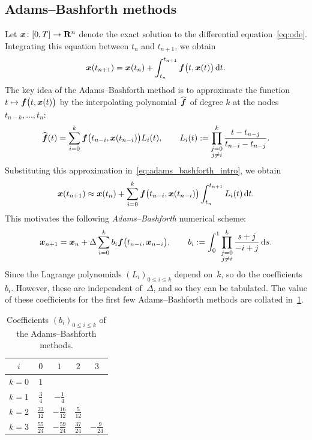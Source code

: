 \subsection{Adams--Bashforth methods}
Let $\mathbf{\boldsymbol{x}}\colon [0, T] \to \mathbf R^n$ denote the exact solution to the differential equation~\eqref{eq:ode}.
Integrating this equation between $t_n$ and $t_{n+1}$,
we obtain
\begin{equation}
    \label{eq:adams_bashforth_intro}
    \mathbf{\boldsymbol{x}}(t_{n+1}) = \mathbf{\boldsymbol{x}}(t_n) + \int_{t_n}^{t_{n+1}} \mathbf{\boldsymbol{f}}\bigl(t, \mathbf{\boldsymbol{x}}(t)\bigr) \, \mathrm d t.
\end{equation}
The key idea of the Adams--Bashforth method is to approximate the function $t \mapsto \mathbf{\boldsymbol{f}}\bigl(t, \mathbf{\boldsymbol{x}}(t)\bigr)$ by the interpolating polynomial~$\widehat {\mathbf{\boldsymbol{f}}}$ of degree $k$ at the nodes
$t_{n-k}, \dotsc, t_n$:
\begin{equation}
    \label{eq:interpolation}
    \widehat {\mathbf{\boldsymbol{f}}}(t) = \sum_{i=0}^{k} \mathbf{\boldsymbol{f}}\bigl(t_{n-i}, \mathbf{\boldsymbol{x}}(t_{n-i})\bigr) L_i(t),
    \qquad L_i(t) := \prod_{\substack{j=0 \\ j\neq i}}^{k} \frac{t - t_{n-j}}{t_{n-i} - t_{n-j}}.
\end{equation}
Substituting this approximation in~\eqref{eq:adams_bashforth_intro},
we obtain
\[
    \mathbf{\boldsymbol{x}}(t_{n+1}) \approx \mathbf{\boldsymbol{x}}(t_n) + \sum_{i=0}^{k} \mathbf{\boldsymbol{f}}\bigl(t_{n-i}, \mathbf{\boldsymbol{x}}(t_{n-i})\bigr) \int_{t_n}^{t_{n+1}} L_i(t)\, \mathrm d t.
\]
This motivates the following \emph{Adams--Bashforth} numerical scheme:
\begin{equation}
    \label{eq:adams_bashforth}
    \mathbf{\boldsymbol{x}}_{n+1} = \mathbf{\boldsymbol{x}}_n + \Delta \sum_{i=0}^{k} b_i \mathbf{\boldsymbol{f}}\bigl(t_{n-i}, \mathbf{\boldsymbol{x}}_{n-i}\bigr),
    \qquad b_i := \int_{0}^{1} \prod_{\substack{j=0 \\ j\neq i}}^{k} \frac{s + j}{-i + j} \, \mathrm d s.
\end{equation}
Since the Lagrange polynomials $(L_i)_{0\leq i\leq k}$ depend on~$k$,
so do the coefficients $b_i$.
However, these are independent of~$\Delta$,
and so they can be tabulated.
The value of these coefficients for the first few Adams--Bashforth methods are collated in~\cref{table:adams_bashforth}.

\begin{table}[ht]
    \centering
    \begin{tabular}{|c|c|c|c|c|}
         \hline \phantom{$\Big($}
             $i$ & $0$ & $1$ & $2$ & $3$
         \\ \hline \phantom{$\Big($}
             $k=0$ & $1$ & & &
         \\ \hline \phantom{$\Big($}
             $k=1$ & $\frac{3}{4}$ & $-\frac{1}{4}$ & &
         \\ \hline \phantom{$\Big($}
             $k=2$ & $\frac{23}{12}$ & $-\frac{16}{12}$ & $\frac{5}{12}$ &
         \\ \hline \phantom{$\Big($}
             $k=3$ & $\frac{55}{24}$ & $-\frac{59}{24}$ & $\frac{37}{24}$ & $-\frac{9}{24}$
         \\ \hline
    \end{tabular}
    \caption{%
        Coefficients $(b_i)_{0 \leq i \leq k}$ of the Adams--Bashforth methods.
    }
    \label{table:adams_bashforth}
\end{table}

